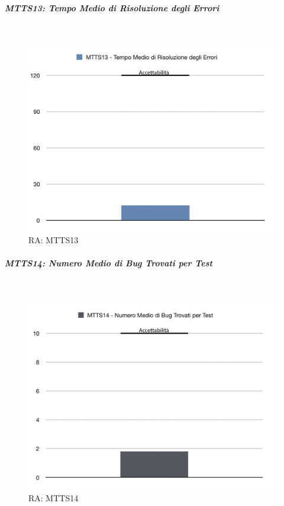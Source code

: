 \subparagraph{MTTS13: Tempo Medio di Risoluzione degli Errori} \-\\

\begin{figure}[H]
	\begin{center}
		\includegraphics[scale=0.5]{./images/grafici_RA/PR05_temprisoluzioneerrori.png} 
		\caption{RA: MTTS13}
	\end{center}
\end{figure}

\pagebreak

\subparagraph{MTTS14: Numero Medio di Bug Trovati per Test} \-\\

\begin{figure}[H]
	\begin{center}
		\includegraphics[scale=0.5]{./images/grafici_RA/PR05errorimedi.png} 
		\caption{RA: MTTS14}
	\end{center}
\end{figure}

